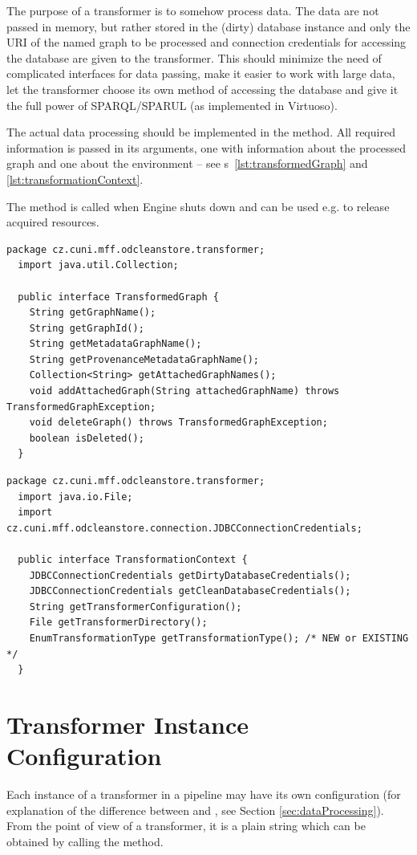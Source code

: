 The purpose of a transformer is to somehow process data. The data are not passed in memory, but rather stored in the (dirty) database instance and only the URI of the named graph to be processed and connection credentials for accessing the database are given to the transformer. This should minimize the need of complicated interfaces for data passing, make it easier to work with large data, let the transformer choose its own method of accessing the database and give it the full power of SPARQL/SPARUL (as implemented in Virtuoso).

The actual data processing should be implemented in the  method. All required information is passed in its arguments, one with information about the processed graph and one about the environment -- see \lstlistingname{}s~\ref{lst:transformedGraph} and \ref{lst:transformationContext}.

The  method is called when Engine shuts down and can be used e.g. to release acquired resources.

\begin{lstlisting}[caption={TransformedGraph interface},label=lst:transformedGraph]
  package cz.cuni.mff.odcleanstore.transformer;
  import java.util.Collection;

  public interface TransformedGraph {
    String getGraphName();
    String getGraphId();
    String getMetadataGraphName();
    String getProvenanceMetadataGraphName();
    Collection<String> getAttachedGraphNames();
    void addAttachedGraph(String attachedGraphName) throws TransformedGraphException;
    void deleteGraph() throws TransformedGraphException;
    boolean isDeleted();
  }
\end{lstlisting}

\begin{lstlisting}[caption={TransformationContext interface},label=lst:transformationContext]
  package cz.cuni.mff.odcleanstore.transformer;
  import java.io.File;
  import cz.cuni.mff.odcleanstore.connection.JDBCConnectionCredentials;

  public interface TransformationContext {
    JDBCConnectionCredentials getDirtyDatabaseCredentials();
    JDBCConnectionCredentials getCleanDatabaseCredentials();
    String getTransformerConfiguration();
    File getTransformerDirectory();
    EnumTransformationType getTransformationType(); /* NEW or EXISTING */
  }
\end{lstlisting}

\section{Transformer Instance Configuration}
Each instance of a transformer in a pipeline may have its own configuration (for explanation of the difference between  and , see Section \ref{sec:dataProcessing}). From the point of view of a transformer, it is a plain string which can be obtained by calling the  method.

